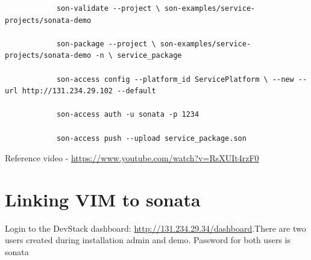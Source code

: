 \begin{itemize}
\begin{itemize}
\begin{lstlisting}
			son-validate --project \ son-examples/service-projects/sonata-demo
			
			son-package --project \ son-examples/service-projects/sonata-demo -n \ service_package
			
			son-access config --platform_id ServicePlatform \ --new --url http://131.234.29.102 --default 
			
			son-access auth -u sonata -p 1234
			
			son-access push --upload service_package.son
			\end{lstlisting}
			Reference video - \hyperlink{name}{https://www.youtube.com/watch?v=RsXUIt4rzF0}
		\end{itemize}
		
	\end{itemize}
	
	
	\section{Linking VIM to sonata}
	\label{sec:Linking VIM to sonata}
	Login to the DevStack dashboard: \hyperlink{name}{http://131.234.29.34/dashboard}.There are two users created during installation admin and demo. Password for both users is sonata
